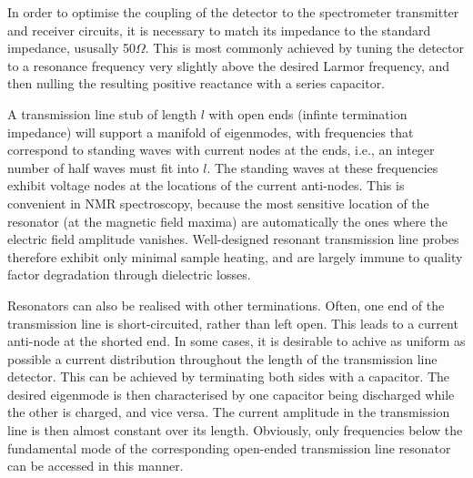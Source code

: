 In order to optimise the coupling of the detector to the spectrometer transmitter and 
receiver circuits, it is necessary to match its impedance to the standard impedance,
ususally 50$\Omega$. This is most commonly achieved by tuning the detector to a resonance
frequency very slightly above the desired Larmor frequency, and then nulling the resulting
positive reactance with a series capacitor. 

A transmission line stub of length $l$ with open ends (infinte termination impedance) will support
a manifold of eigenmodes, with frequencies that correspond to standing waves with current nodes
at the ends, i.e., an integer number of half waves must fit into $l$. The standing waves at these
frequencies exhibit voltage nodes at the locations of the current anti-nodes. This is convenient in 
NMR spectroscopy, because the most sensitive location of the resonator (at the 
magnetic field maxima) are automatically the ones where the electric field amplitude vanishes.
Well-designed resonant transmission line probes therefore exhibit only minimal sample heating, and 
are largely immune to quality factor degradation through dielectric losses.

Resonators can also be realised with other terminations. Often, one end of the transmission line
is short-circuited, rather than left open. This leads to a current anti-node at the shorted
end. 
In some cases, it is desirable to achive as uniform as possible a current distribution throughout
the length of the transmission line detector. This can be achieved by terminating both sides with
a capacitor. The desired eigenmode is then characterised by one capacitor being discharged
while the other is charged, and vice versa. The current amplitude in the transmission line
is then almost constant over its length. Obviously, only frequencies below the fundamental
mode of the corresponding open-ended transmission line resonator can be accessed in this manner.



